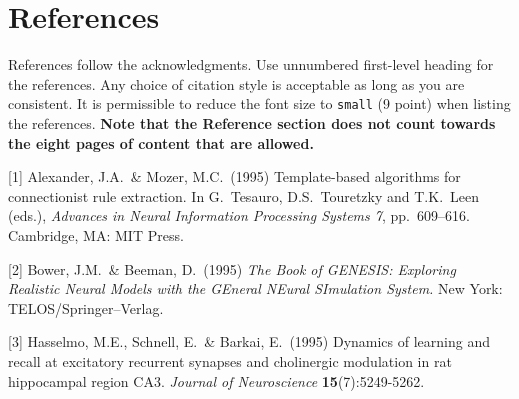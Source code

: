 \documentclass{article}
\begin{document}
\section*{References}

References follow the acknowledgments. Use unnumbered first-level heading for
the references. Any choice of citation style is acceptable as long as you are
consistent. It is permissible to reduce the font size to \verb+small+ (9 point)
when listing the references.
{\bf Note that the Reference section does not count towards the eight pages of content that are allowed.}
\medskip

\small

[1] Alexander, J.A.\ \& Mozer, M.C.\ (1995) Template-based algorithms for
connectionist rule extraction. In G.\ Tesauro, D.S.\ Touretzky and T.K.\ Leen
(eds.), {\it Advances in Neural Information Processing Systems 7},
pp.\ 609--616. Cambridge, MA: MIT Press.

[2] Bower, J.M.\ \& Beeman, D.\ (1995) {\it The Book of GENESIS: Exploring
  Realistic Neural Models with the GEneral NEural SImulation System.}  New York:
TELOS/Springer--Verlag.

[3] Hasselmo, M.E., Schnell, E.\ \& Barkai, E.\ (1995) Dynamics of learning and
recall at excitatory recurrent synapses and cholinergic modulation in rat
hippocampal region CA3. {\it Journal of Neuroscience} {\bf 15}(7):5249-5262.
\end{document}
